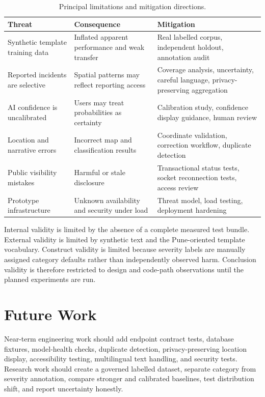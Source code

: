 \documentclass[11pt]{article}
\begin{document}
\begin{table}[H]
\centering
\caption{Principal limitations and mitigation directions.}
\label{tab:limits}
\small
\begin{tabularx}{\textwidth}{p{}p{}X}
\toprule
\textbf{Threat} & \textbf{Consequence} & \textbf{Mitigation}\\
\midrule
Synthetic template training data & Inflated apparent performance and weak transfer & Real labelled corpus, independent holdout, annotation audit\\
Reported incidents are selective & Spatial patterns may reflect reporting access & Coverage analysis, uncertainty, careful language, privacy-preserving aggregation\\
AI confidence is uncalibrated & Users may treat probabilities as certainty & Calibration study, confidence display guidance, human review\\
Location and narrative errors & Incorrect map and classification results & Coordinate validation, correction workflow, duplicate detection\\
Public visibility mistakes & Harmful or stale disclosure & Transactional status tests, socket reconnection tests, access review\\
Prototype infrastructure & Unknown availability and security under load & Threat model, load testing, deployment hardening\\
\bottomrule
\end{tabularx}
\end{table}

Internal validity is limited by the absence of a complete measured test
bundle. External validity is limited by synthetic text and the Pune-oriented
template vocabulary. Construct validity is limited because severity labels
are manually assigned category defaults rather than independently observed
harm. Conclusion validity is therefore restricted to design and code-path
observations until the planned experiments are run.

\section{Future Work}
\label{sec:future}

Near-term engineering work should add endpoint contract tests, database
fixtures, model-health checks, duplicate detection, privacy-preserving
location display, accessibility testing, multilingual text handling, and
security tests. Research work should create a governed labelled dataset,
separate category from severity annotation, compare stronger and calibrated
baselines, test distribution shift, and report uncertainty honestly.
\end{document}
